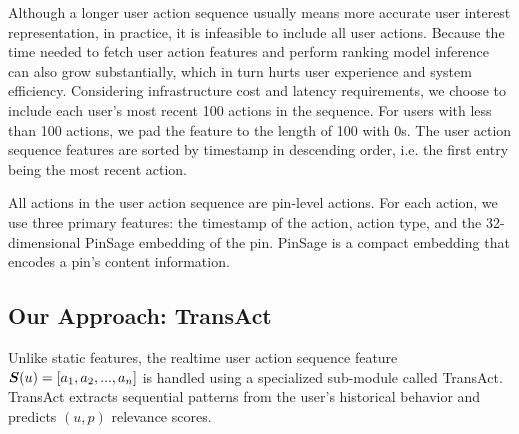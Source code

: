 Although a longer user action sequence usually means more accurate user interest representation, in practice, it is infeasible to include all user actions. Because the time needed to fetch user action features and perform ranking model inference can also grow substantially, which in turn hurts user experience and system efficiency. Considering infrastructure cost and latency requirements, we choose to include each user's most recent 100 actions in the sequence. For users with less than 100 actions, we pad the feature to the length of 100 with 0s. The user action sequence features are sorted by timestamp in descending order, i.e. the first entry being the most recent action.






All actions in the user action sequence are pin-level actions. For each action, we use three primary features: the timestamp of the action, action type, and the 32-dimensional PinSage embedding \cite{PinSage} of the pin. 
PinSage is a compact embedding that encodes a pin's content information. 


\subsection{Our Approach: TransAct}

Unlike static features, the realtime user action sequence feature $\boldsymbol{S}(u) = [a_1,a_2, ...,a_n]$ is handled using a specialized sub-module called TransAct. TransAct extracts sequential patterns from the user's historical behavior and predicts $(u, p)$ relevance scores.

